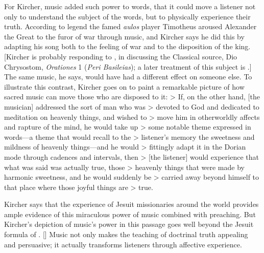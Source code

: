 For Kircher, music added such power to words, that it could move a listener not only to understand the subject of the words, but to physically experience their truth.
According to legend the famed \emph{aulos} player Timotheus aroused Alexander the Great to the furor of war through music, and Kircher says he did this by adapting his song both to the feeling of war and to the disposition of the king.
[Kircher is probably responding to \autocite[90]{Galilei:Dialogo}, in discussing
the Classical source, Dio Chrysostom, \emph{Orationes} 1 (\emph{Peri
Basileias}); a later treatment of this subject is \autocite{Dryden:Alexander}.]
The same music, he says, would have had a different effect on someone else.
To illustrate this contrast, Kircher goes on to paint a remarkable picture of how sacred music can move those who are disposed to it:
> If, on the other hand, [the musician] addressed the sort of man who was > devoted to God and dedicated to meditation on heavenly things, and wished to > move him in otherworldly affects and rapture of the mind, he would take up > some notable theme expressed in words---a theme that would recall to the > listener's memory the sweetness and mildness of heavenly things---and he would > fittingly adapt it in the Dorian mode through cadences and intervals, then > [the listener] would experience that what was said was actually true, those > heavenly things that were made by harmonic sweetness, and he would suddenly be > carried away beyond himself to that place where those joyful things are > true.
\Autocite[bk. 7, p. 550: .]{Kircher:Musurgia}

Kircher says that the experience of Jesuit missionaries around the world provides ample evidence of this miraculous power of music combined with preaching.
But Kircher's depiction of music's power in this passage goes well beyond the Jesuit formula of .
[\Autocite[On the Jesuit approach to religious arts, see][35--51]{Bailey:Art}]
Music not only makes the teaching of doctrinal truth appealing and persuasive; it actually transforms listeners through affective experience.

